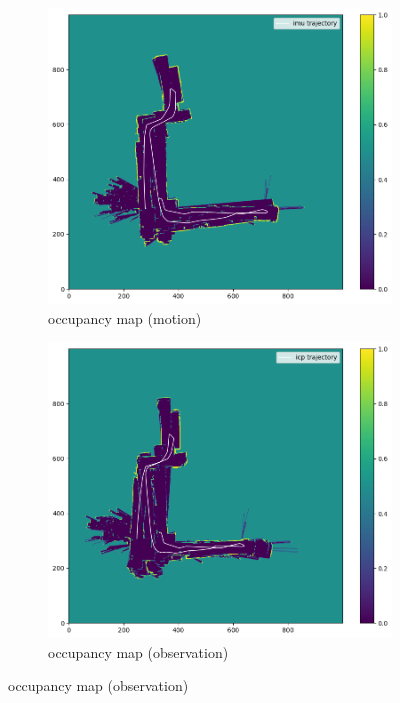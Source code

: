 \documentclass[conference]{IEEEtran}
\begin{document}
\begin{figure}
    \begin{subfigure}{0.24\textwidth}
        \includegraphics[width=\linewidth]{../img/omap_21_imu.png}
        \caption{occupancy map (motion)}
        \label{fig:omap_21_imu}
    \end{subfigure}
    \hfill
    \begin{subfigure}{0.24\textwidth}
        \includegraphics[width=\linewidth]{../img/omap_21_icp.png}
        \caption{occupancy map (observation)}

\end{subfigure}
\end{figure}
\end{document}
